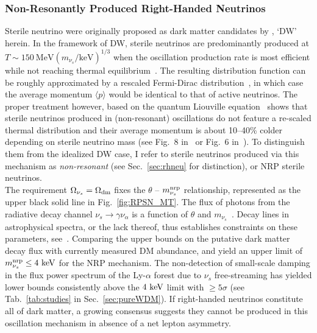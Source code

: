 \subsubsection*{Non-Resonantly Produced Right-Handed Neutrinos}

Sterile neutrino were originally proposed as dark matter candidates by \cite{DodelsonWidrow94}, `DW' herein.  In the framework of DW, sterile neutrinos are predominantly produced  at 
$T \sim 150~\mathrm{MeV}(m_{\nu_s}/\mathrm{keV})^{1/3}$ when the oscillation production
rate is most efficient while not reaching thermal
equilibrium~\citep{DodelsonWidrow94, Dolgov2000ew, Abazajian2001nj, Asaka2006nq}.  The resulting distribution
function can be roughly approximated by a rescaled Fermi-Dirac
distribution~\citep{Dolgov2000ew}, in which case the average momentum
$\langle p\rangle$ would be identical to that of active neutrinos. The
proper treatment however, based on the quantum Liouville equation~\citep{Asaka2006rw}
shows that sterile neutrinos produced in (non-resonant) oscillations do not
feature a re-scaled thermal distribution and their average momentum is about 10--40\% colder
depending on sterile neutrino mass (see Fig.~8 in~\cite{Asaka2006nq} or
Fig.~6 in~\cite{Laine2008pg}). To distinguish them from the idealized DW
case, I refer to sterile neutrinos produced via this mechanism as \emph{non-resonant} (see Sec.~\ref{sec:rhneu} for distinction), or NRP sterile neutrinos. \\


The requirement  $\Omega_{\nu_s} = \Omega_{\rm{dm}}$ fixes the $\theta$ --
$m_{\nu_s}^{\rm{nrp}}$ relationship, represented as the upper black solid line
in Fig.~\ref{fig:RPSN_MT}. The flux of photons from the radiative decay channel
$\nu_s \rightarrow \gamma \nu_\alpha$ is a function of $\theta$ and
$m_{\nu_s}$~\citep{Pal1981rm}. Decay lines in astrophysical spectra, or the
lack thereof, thus establishes constraints on these
parameters, see~\cite{Dolgov2000ew, Abazajian2001vt, Boyarsky2005us, Boyarsky2006fg}. Comparing
the upper bounds on the putative dark matter decay flux with currently measured  DM abundance, \cite{BNRST06} and \cite{BNR07} yield an upper limit of $m_{\nu_s}^{\rm{nrp}} \leq 4~\rm{keV}$ for the NRP mechanism. The non-detection of small-scale damping in the flux power spectrum of the Ly-$\alpha$ forest due to $\nu_s$ free-streaming has yielded lower bounds consistently above the $4~\rm{keV}$ limit with $\geq 5 \sigma$ (see Tab.~\ref{tab:studies} in Sec.~\ref{sec:pureWDM}). If right-handed neutrinos constitute all of dark matter, a growing consensus suggests they cannot be produced in this oscillation mechanism in absence of a net lepton asymmetry.


